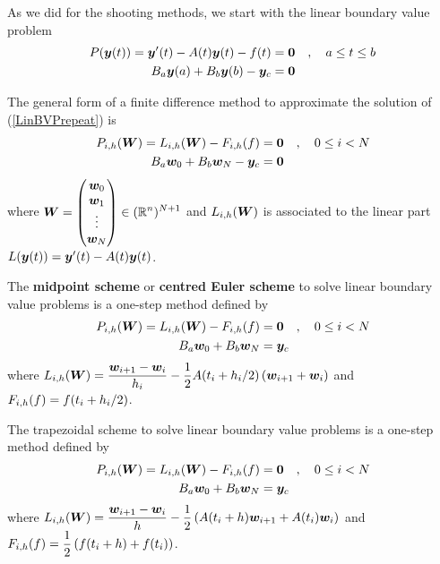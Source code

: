 As we did for the shooting methods, we start with the linear boundary
value problem
\begin{equation}\label{LinBVPrepeat}
\begin{split}
P(\bm{y}(t)) = \bm{y}'(t) - A(t)\bm{y}(t) - f(t) &= \bm{0}
\quad , \quad a \leq t \leq b \\
B_a\bm{y}(a) + B_b\bm{y}(b) - \bm{y}_c &= \bm{0}
\end{split}
\end{equation}

The general form of a finite difference method to approximate the solution of
(\ref{LinBVPrepeat}) is
\begin{equation} \label{LGFFDM}
\begin{split}
P_{i,h}(\bm{W}) = L_{i,h}(\bm{W}) - F_{i,h}(f) &= \bm{0} 
\quad , \quad 0 \leq i < N \\
B_a\bm{w}_0 + B_b\bm{w}_N - \bm{y}_c &= \bm{0}
\end{split}
\end{equation}
where
$\displaystyle \bm{W} =
\begin{pmatrix} \bm{w}_0 \\ \bm{w}_1 \\ \vdots \\ \bm{w}_N \end{pmatrix}
\in (\mathbb{R}^n)^{N+1}$ and
$L_{i,h}(\bm{W})$ is associated to the linear part
$L(\bm{y}(t)) = \bm{y}'(t) - A(t)\bm{y}(t)$.

\begin{egg}
The
{\bfseries midpoint scheme}
or
{\bfseries centred Euler scheme}
to solve linear boundary value problems is a one-step method defined by
\begin{align*}
P_{i,h}(\bm{W}) = L_{i,h}(\bm{W}) - F_{i,h}(f) &= \bm{0} \quad ,
\quad 0 \leq i < N \\
B_a\bm{w}_0 + B_b\bm{w}_N &= \bm{y}_c
\end{align*}
where
$\displaystyle L_{i,h}(\bm{W})
= \frac{\bm{w}_{i+1} - \bm{w}_i}{h_i} - \frac{1}{2}
A(t_i+h_i/2) \left( \bm{w}_{i+1} + \bm{w}_i\right)$
and
$\displaystyle F_{i,h}(f) = f(t_i+h_i/2)$.
\label{eggmidpointscheme}
\end{egg}

\begin{egg}
The trapezoidal scheme 
to solve linear boundary value problems is a one-step method defined by
\begin{align*}
P_{i,h}(\bm{W}) = L_{i,h}(\bm{W}) - F_{i,h}(f) &= \bm{0} \quad ,
\quad 0 \leq i < N \\
B_a\bm{w}_0 + B_b\bm{w}_N &= \bm{y}_c
\end{align*}
where
$\displaystyle L_{i,h}(\bm{W})
= \frac{\bm{w}_{i+1} - \bm{w}_i}{h} - \frac{1}{2}
\left( A(t_i+h) \bm{w}_{i+1} + A(t_i) \bm{w}_i \right)$
and \\
$\displaystyle F_{i,h}(f) = \frac{1}{2}\left( f(t_i+h) + f(t_i) \right)$.
\label{eggtrapezSchemeLin}
\end{egg}

